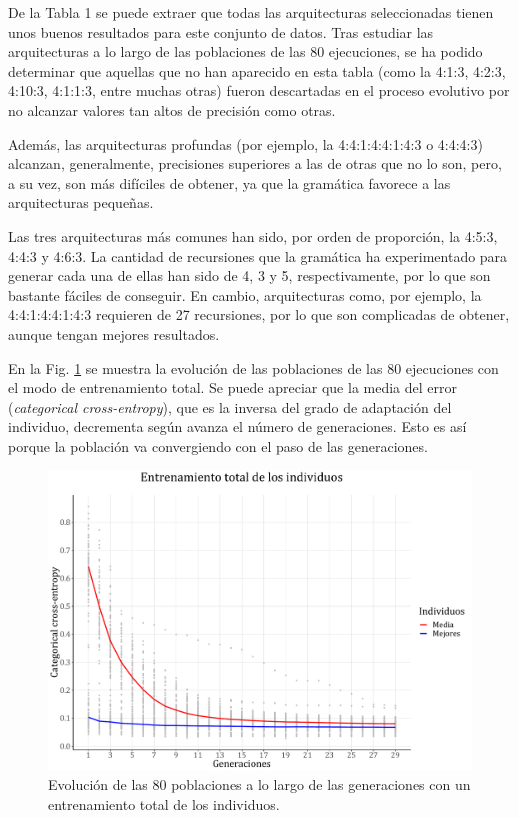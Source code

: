 \documentclass[spanish,a4paper,12pt,twoside]{report}
\begin{document}
  De la Tabla 1 se puede extraer que todas las arquitecturas seleccionadas tienen unos buenos resultados para este conjunto de datos. Tras estudiar las arquitecturas a lo largo de las poblaciones de las 80 ejecuciones, se ha podido determinar que aquellas que no han aparecido en esta tabla (como la 4:1:3, 4:2:3, 4:10:3, 4:1:1:3, entre muchas otras) fueron descartadas en el proceso evolutivo por no alcanzar valores tan altos de precisión como otras. \par
  Además, las arquitecturas profundas (por ejemplo, la 4:4:1:4:4:1:4:3 o 4:4:4:3) alcanzan, generalmente, precisiones superiores a las de otras que no lo son, pero, a su vez, son más difíciles de obtener, ya que la gramática favorece a las arquitecturas pequeñas. \par
  Las tres arquitecturas más comunes han sido, por orden de proporción, la 4:5:3, 4:4:3 y 4:6:3. La cantidad de recursiones que la gramática ha experimentado para generar cada una de ellas han sido de 4, 3 y 5, respectivamente, por lo que son bastante fáciles de conseguir. En cambio, arquitecturas como, por ejemplo, la 4:4:1:4:4:1:4:3 requieren de 27 recursiones, por lo que son complicadas de obtener, aunque tengan mejores resultados. \par
  En la Fig. \ref{fig:18} se muestra la evolución de las poblaciones de las 80 ejecuciones con el modo de entrenamiento total. Se puede apreciar que la media del error (\emph{categorical cross-entropy}), que es la inversa del grado de adaptación del individuo, decrementa según avanza el número de generaciones. Esto es así porque la población va convergiendo con el paso de las generaciones.
  \begin{figure}[H]
    \centering
    \includegraphics[width = 1\textwidth]{resources/Fig18.pdf}
    \caption{Evolución de las 80 poblaciones a lo largo de las generaciones con un entrenamiento total de los individuos.}
    \label{fig:18}
  \end{figure} \par
\end{document}

